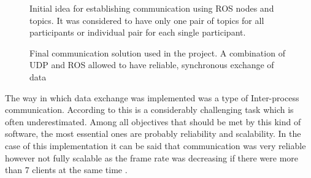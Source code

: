 \documentclass[11pt,english]{article}
\begin{document}
\begin{figure}[!] %
\caption{Initial idea for establishing communication using ROS nodes and topics. It was considered to have only one pair of topics for all participants or individual pair for each single participant.}
\label{fig:ros_initial_idea}
\end{figure} 


\begin{figure}[!] %
\caption{Final communication solution used in the project. A combination of UDP and ROS allowed to have reliable, synchronous exchange of data}
\label{fig:ros_final}
\end{figure} 




The way in which data exchange was implemented was a type of Inter-process communication. According to \citet{rajkumar1995real} this is a considerably challenging task which is often underestimated. Among all objectives that should be met by this kind of  software, the most essential ones are probably reliability and scalability. In the case of this implementation it can be said that communication was very reliable however not fully scalable as the frame rate was decreasing if there were more than 7 clients at the same time \citep{rajkumar1995real}.
\end{document}
